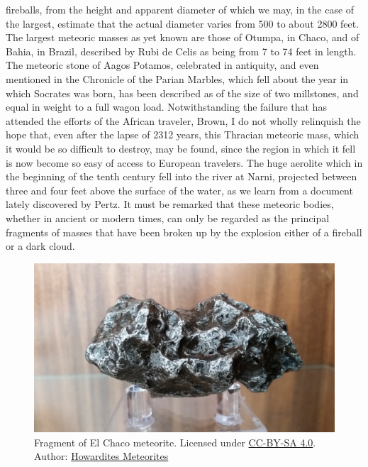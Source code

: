 fireballs, from the height and apparent diameter of which we may, in the case of the largest, estimate that the actual diameter varies from 500 to about 2800 feet. The largest meteoric masses as yet known are those of Otumpa, in Chaco, and of Bahia, in Brazil, described by Rubi de Celis as being from 7 to 74 feet in length. The meteoric stone of Aagos Potamos, celebrated in antiquity, and even mentioned in the Chronicle of the Parian Marbles, which fell about the year in which Socrates was born, has been described as of the size of two millstones, and equal in weight to a full wagon load. Notwithstanding the failure that has attended the efforts of the African traveler, Brown, I do not wholly relinquish the hope that, even after the lapse of 2312 years, this Thracian meteoric mass, which it would be so difficult to destroy, may be found, since the region in which it fell is now become so easy of access to European travelers. The huge aerolite which in the beginning of the tenth century fell into the river at Narni, projected between three and four feet above the surface of the water, as we learn from a document lately discovered by Pertz. It must be remarked that these meteoric bodies, whether in ancient or modern times, can only be regarded as the principal fragments of masses that have been broken up by the explosion either of a fireball or a dark cloud.

\begin{figure}[htbp]
  \centering
  \includegraphics[width=1\textwidth]{../../pictures/Campo_del_Cielo_Museum_Grade_275_grams.jpg}
  \caption{Fragment of El Chaco meteorite. Licensed under \href{https://creativecommons.org/licenses/by-sa/4.0/deed.en}{CC-BY-SA 4.0}. Author: \href{https://commons.wikimedia.org/wiki/File:Campo_del_Cielo_Museum_Grade_275_grams.jpg}{Howardites Meteorites}}
  \label{fig:figure_label}
\end{figure}

